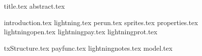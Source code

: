 \documentclass[11pt]{llncs}
\begin{document}
{title.tex}
\thispagestyle{plain}
{abstract.tex}

{introduction.tex}
{lightning.tex}
{perun.tex}
{sprites.tex}
{properties.tex}
{lightningopen.tex}
{lightningpay.tex}
{lightningprot.tex}

{txStructure.tex}
{payfunc.tex}
{lightningnotes.tex}
{model.tex}

\end{document}
